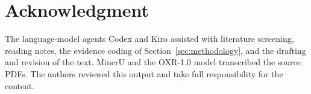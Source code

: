 \documentclass[journal]{IEEEtran}
\begin{document}
\section*{Acknowledgment}
The language-model agents Codex and Kiro assisted with literature screening, reading notes, the evidence coding of Section~\ref{sec:methodology}, and the drafting and revision of the text. MinerU and the OXR-1.0 model transcribed the source PDFs. The authors reviewed this output and take full responsibility for the content.



\end{document}
